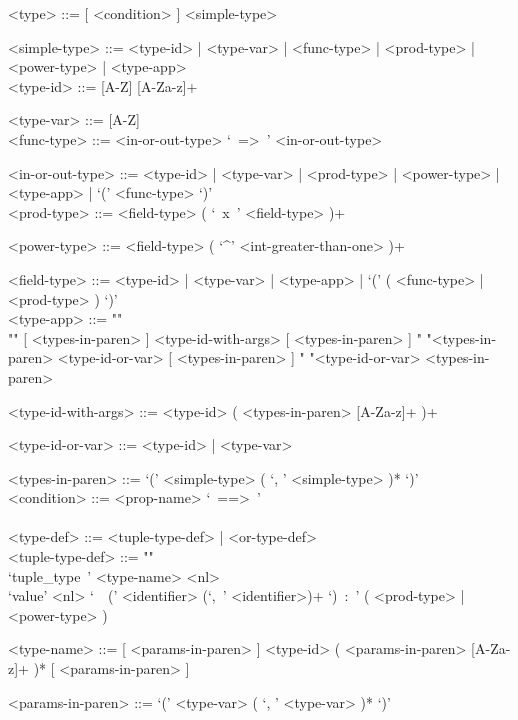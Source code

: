 \documentclass{article}
\begin{document}
\begin{grammar}
<type> ::= [ <condition> ]  <simple-type> 

<simple-type> ::=
<type-id> | <type-var> | <func-type> | <prod-type> | <power-type> | <type-app>
\\

<type-id> ::= [A-Z] [A-Za-z]+ 

<type-var> ::= [A-Z]
\\

<func-type> ::= <in-or-out-type> `\ =>\ ' <in-or-out-type>

<in-or-out-type> ::=
<type-id> | <type-var> | <prod-type> | <power-type> | <type-app> |
`(' <func-type> `)'
\\

<prod-type> ::= <field-type> ( `\ x\ ' <field-type> )+

<power-type> ::= <field-type> ( `^' <int-greater-than-one> )+

<field-type> ::=
<type-id> | <type-var> | <type-app> | `(' ( <func-type> | <prod-type> ) `)'
\\

<type-app> ::= ""\\""
[ <types-in-paren> ] <type-id-with-args> [ <types-in-paren> ]
\alt " "<types-in-paren> <type-id-or-var> [ <types-in-paren> ]
\alt " "<type-id-or-var> <types-in-paren>

<type-id-with-args> ::= <type-id> ( <types-in-paren> [A-Za-z]+ )+

<type-id-or-var> ::= <type-id> | <type-var>

<types-in-paren> ::= `(' <simple-type> ( `, ' <simple-type> )* `)'
\\

<condition> ::= <prop-name> `\ ==>\ ' 
\\
\\

<type-def> ::= <tuple-type-def> | <or-type-def>
\\

<tuple-type-def> ::= ""\\
`tuple_type\ ' <type-name> <nl> \\
`value' <nl> `\ \ (' <identifier> (`,\ ' <identifier>)+ `)\ :\ '
( <prod-type> | <power-type> )

<type-name> ::= 
[ <params-in-paren> ] <type-id> ( <params-in-paren> [A-Za-z]+ )*
[ <params-in-paren> ]

<params-in-paren> ::= `(' <type-var> ( `, ' <type-var> )* `)'
\\


\end{grammar}
\end{document}
